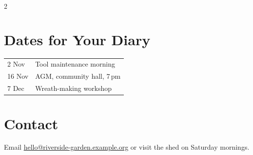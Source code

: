\documentclass[10pt,a4paper]{article}
\begin{document}
\begin{multicols}{2}
\section*{Dates for Your Diary}
\begin{tabular}{@{}ll@{}}
2 Nov & Tool maintenance morning \\
16 Nov & AGM, community hall, 7\,pm \\
7 Dec & Wreath-making workshop \\
\end{tabular}

\vfill\columnbreak

\section*{Contact}
Email \href{mailto:hello@riverside-garden.example.org}{hello@riverside-garden.example.org}
or visit the shed on Saturday mornings.

\end{multicols}
\end{document}
